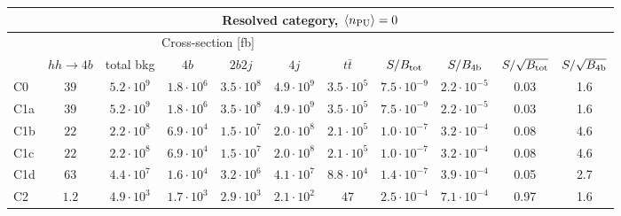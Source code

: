 \begin{tabular}{|l|cc|cccc|cccc|}
  \hline
\multicolumn{11}{|c|}{Resolved category, $\left\langle n_{\rm PU}\right\rangle=0$}\\
\hline
&  \multicolumn{6}{c|}{Cross-section [fb]} &  &  & &  \\
   &  $hh\to 4b$ &  total bkg  &   $4b$    &  $2b2j$   &   $4j$    &
$t\bar{t}$ &
$S/B_{\rm tot}$ & $S/B_{\rm 4b}$ & $S/\sqrt{B_{\rm tot}}$ & $S/\sqrt{B_{\rm 4b}}$ \\
  \hline
  \hline
 C0    & $39$  &   $5.2\cdot 10^9$   & $1.8\cdot 10^6$ & $3.5\cdot 10^8$ & $4.9\cdot 10^9$ & $3.5\cdot 10^5$  & $7.5\cdot 10^{-9}$   &  $2.2\cdot 10^{-5}$  &   0.03   & 1.6        \\
 C1a   & $39$  &   $5.2\cdot 10^9$   & $1.8\cdot 10^6$ & $3.5\cdot 10^8$ & $4.9\cdot 10^9$ & $3.5\cdot 10^5$ &  $7.5\cdot 10^{-9}$   & $2.2\cdot 10^{-5}$   &     0.03   & 1.6       \\
 C1b   & $22$  &   $2.2\cdot 10^8$   & $6.9\cdot 10^4$ & $1.5\cdot 10^7$ & $2.0\cdot 10^8$ & $2.1\cdot 10^5$ &  $1.0\cdot 10^{-7}$  &  $3.2\cdot 10^{-4}$  &  0.08   & 4.6         \\
 C1c   & $22$  &   $2.2\cdot 10^8$   & $6.9\cdot 10^4$ & $1.5\cdot 10^7$ & $2.0\cdot 10^8$ & $2.1\cdot 10^5$ &  $1.0\cdot 10^{-7}$  & $3.2\cdot 10^{-4}$   &  0.08   & 4.6         \\
 C1d   & $63$  &   $4.4\cdot 10^7$   & $1.6\cdot 10^4$ & $3.2\cdot 10^6$ & $4.1\cdot 10^7$ & $8.8\cdot 10^4$ &   $1.4\cdot 10^{-7}$  &  $3.9\cdot 10^{-4}$   &   0.05   & 2.7         \\
 C2    & $1.2$  &   $4.9\cdot 10^3$   & $1.7\cdot 10^3$ & $2.9\cdot 10^3$ & $2.1\cdot 10^2$ & $47$ &            $ 2.5\cdot 10^{-4}$   & $7.1\cdot 10^{-4}$   &   0.97   & 1.6       \\
\hline
\end{tabular}
